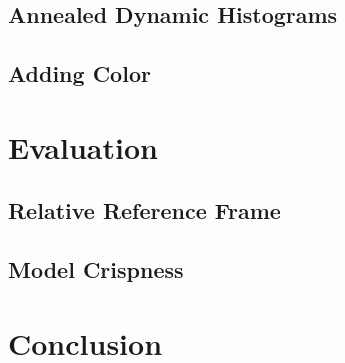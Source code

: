\documentclass[twoside,a4paper,article]{combine}
\begin{document}
\subsection{Annealed Dynamic Histograms}
\label{sub:adh}
\subsection{Adding Color}
\label{sub:adding-color}

\section{Evaluation}
\label{sec:evaluation}
\subsection{Relative Reference Frame}
\label{sub:relative-ref-frame}
\subsection{Model Crispness}
\label{sub:model-crispness}

\section{Conclusion}
\label{sec:conclusion}





\end{document}
